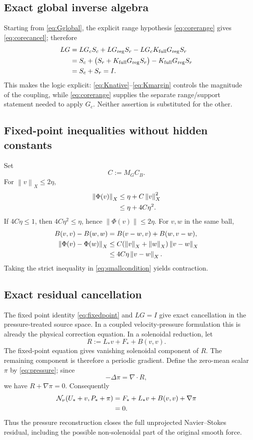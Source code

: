 \documentclass[11pt]{article}
\numberwithin{equation}{section}
\newcommand{\N}{\mathcal N}
\newcommand{\norm}[1]{\left\lVert #1\right\rVert}
\begin{document}
\subsection{Exact global inverse algebra}
Starting from \eqref{eq:Gglobal}, the explicit range hypothesis \eqref{eq:corerange} gives \eqref{eq:corecancel}; therefore
\begin{align}
LG
&=LG_cS_c+LG_{\rm reg}S_r-LG_cK_{\rm full}G_{\rm reg}S_r\notag\\
&=S_c+\bigl(S_r+K_{\rm full}G_{\rm reg}S_r\bigr)-K_{\rm full}G_{\rm reg}S_r\notag\\
&=S_c+S_r=I.
\label{eq:globalalgebra}
\end{align}
This makes the logic explicit: \eqref{eq:Knative}--\eqref{eq:Kmargin} controls the magnitude of the coupling, while \eqref{eq:corerange} supplies the separate range/support statement needed to apply \(G_c\).  Neither assertion is substituted for the other.

\subsection{Fixed-point inequalities without hidden constants}
Set
\begin{equation}
C:=M_GC_B.
\label{eq:C}
\end{equation}
For \(\norm v_X\le2\eta\),
\begin{align}
\norm{\Phi(v)}_X
&\le\eta+C\norm v_X^2\notag\\
&\le\eta+4C\eta^2.
\label{eq:mapineq}
\end{align}
If \(4C\eta\le1\), then \(4C\eta^2\le\eta\), hence \(\norm{\Phi(v)}\le2\eta\).  For \(v,w\) in the same ball,
\begin{align}
B(v,v)-B(w,w)&=B(v-w,v)+B(w,v-w),\label{eq:Bdiff}\\
\norm{\Phi(v)-\Phi(w)}_X
&\le C(\norm v_X+\norm w_X)\norm{v-w}_X\notag\\
&\le4C\eta\norm{v-w}_X.
\label{eq:lipdetail}
\end{align}
Taking the strict inequality in \eqref{eq:smallcondition} yields contraction.

\subsection{Exact residual cancellation}
The fixed point identity \eqref{eq:fixedpoint} and \(LG=I\) give exact cancellation in the pressure-treated source space.  In a coupled velocity-pressure formulation this is already the physical correction equation.  In a solenoidal reduction, let
\[
R:=L_*v+F_*+B(v,v).
\]
The fixed-point equation gives vanishing solenoidal component of \(R\).  The remaining component is therefore a periodic gradient.  Define the zero-mean scalar \(\pi\) by \eqref{eq:pressure}; since
\[
-\Delta\pi=\nabla\!\cdot R,
\]
we have \(R+\nabla\pi=0\).  Consequently
\begin{align}
\N_\nu(U_*+v,P_*+\pi)
&=F_*+L_*v+B(v,v)+\nabla\pi\notag\\
&=0.
\label{eq:exactcancel}
\end{align}
Thus the pressure reconstruction closes the full unprojected Navier--Stokes residual, including the possible non-solenoidal part of the original smooth force.
\end{document}
